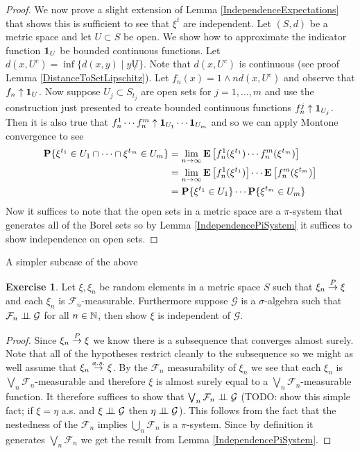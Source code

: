 \documentclass{amsart}
\theoremstyle{remark}
\theoremstyle{definition}
\newtheorem{ex}[thm]{Exercise}
\begin{document}
\begin{proof}
We now prove a slight extension of Lemma
\ref{IndependenceExpectations} that shows this is sufficient to see
that $\xi^t$ are independent.  Let $(S,d)$ be a metric space and let
$U \subset S$ be open.  We show how to approximate the indicator
function $\textbf{1}_{U}$ be bounded continuous functions.  Let
$d(x, U^c) = \inf \lbrace d(x,y) \mid y \not U \rbrace$.  Note that
$d(x, U^c)$ is continuous (see proof Lemma
\ref{DistanceToSetLipschitz}).  Let $f_n(x) = 1 \wedge n d(x, U^c)$
and observe that $f_n \uparrow \textbf{1}_{U}$.  Now suppose
$U_{j} \subset S_{t_j}$ are open sets for $j=1, \dotsc,m$ and use the
construction just presented to create bounded continuous functions
$f^j_n \uparrow \textbf{1}_{U_j}$.  Then it is also true that
$f^1_n \dotsm f^m_n \uparrow \textbf{1}_{U_1} \dotsm
\textbf{1}_{U_m}$ and so we can apply Montone convergence to see 
\begin{align*}
\textbf{P}\{\xi^{t_1} \in U_1 \cap \dotsb \cap \xi^{t_m} \in U_m\} &=
\lim_{n \to \infty} \textbf{E}\left[f^1_n(\xi^{t_1}) \dotsm
f^m_n(\xi^{t_m})\right] \\
&= \lim_{n \to \infty} \textbf{E}\left[f^1_n(\xi^{t_1}) \right] \dotsm
\textbf{E}\left[f^m_n(\xi^{t_m})\right] \\
&= \textbf{P}\{\xi^{t_1} \in U_1\} \dotsm\textbf{P}\{\xi^{t_m} \in
  U_m\} 
\end{align*}
Now it suffices to note that the open sets  in a metric space are a
$\pi$-system that generates all of the Borel sets so by Lemma
\ref{IndependencePiSystem} it suffices to
show independence on open sets.
\end{proof}

A simpler subcase of the above
\begin{ex}Let $\xi, \xi_n$ be random elements in a metric space $S$
  such that $\xi_n \overset{P}\to \xi$ and each $\xi_n$ is
  $\mathcal{F}_n$-measurable.  Furthermore suppose $\mathcal{G}$ is a
  $\sigma$-algebra such that $\mathcal{F}_n \perp \! \! \! \perp \mathcal{G}$
  for all $n \in \mathbb{N}$, then show $\xi$ is independent of $\mathcal{G}$.
\end{ex}
\begin{proof}
Since $\xi_n \overset{P}\to \xi$ we know there is a subsequence  that
converges almost surely.  Note that all of the hypotheses restrict
cleanly to the subsequence so we might as well assume that $\xi_n
\overset{a.s.}\to \xi$.  By the $\mathcal{F}_n$ measurability of $\xi_n$ we see
that each $\xi_n$ is $\bigvee_n \mathcal{F}_n$-measurable and
therefore $\xi$ is almost surely equal to a $\bigvee_n
\mathcal{F}_n$-measurable function.  It therefore suffices to show
that $\bigvee_n
\mathcal{F}_n \perp \! \! \! \perp \mathcal{G}$ (TODO: show this simple fact; if $\xi
= \eta$ a.s. and $\xi \perp \! \! \! \perp \mathcal{G}$ then $\eta \perp \! \! \! \perp
\mathcal{G}$).  This follows from the fact
that the nestedness of the $\mathcal{F}_n$ implies $\bigcup_n
\mathcal{F}_n$ is a $\pi$-system.  Since by definition it generates $\bigvee_n
\mathcal{F}_n$ we get the result from Lemma \ref{IndependencePiSystem}.
\end{proof}
\end{document}
